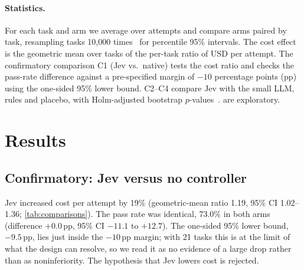 \documentclass[10pt]{article}
\begin{document}
\paragraph{Statistics.}
For each task and arm we average over attempts and compare arms paired by task, resampling tasks 10{,}000 times~\citep{efron1993bootstrap} for percentile 95\% intervals.
The cost effect is the geometric mean over tasks of the per-task ratio of USD per attempt.
The confirmatory comparison C1 (Jev vs.\ native) tests the cost ratio and checks the pass-rate difference against a pre-specified margin of $-10$ percentage points (pp) using the one-sided 95\% lower bound.
C2--C4 compare Jev with the small LLM, rules and placebo, with Holm-adjusted bootstrap $p$-values~\citep{holm1979simple}.
 are exploratory.

\section{Results}

\begin{table}[t]
  \centering
  \caption{Per-arm results on the 21 held-out tasks (63 attempts per arm). Decisions: controller consultations per attempt; verify: verification messages appended per attempt.}
  \label{tab:summary}
  
\end{table}

\begin{table}[t]
  \centering
  \caption{Paired comparisons (by task, 21 tasks). Pass-rate differences in percentage points; cost as geometric-mean ratio of USD per attempt. $p$: bootstrap $p$-value for the cost ratio, unadjusted for C1 (confirmatory) and Holm-adjusted across C2--C4. All Holm-adjusted pass-rate $p$-values are 1.00.}
  \label{tab:comparisons}
  
\end{table}

\subsection{Confirmatory: Jev versus no controller}
\label{sec:c1}

Jev increased cost per attempt by 19\% (geometric-mean ratio 1.19, 95\% CI 1.02--1.36; \cref{tab:comparisons}).
The pass rate was identical, 73.0\% in both arms (difference $+0.0$\,pp, 95\% CI $-11.1$ to $+12.7$).
The one-sided 95\% lower bound, $-9.5$\,pp, lies just inside the $-10$\,pp margin; with 21 tasks this is at the limit of what the design can resolve, so we read it as no evidence of a large drop rather than as noninferiority.
The hypothesis that Jev lowers cost is rejected.
\end{document}
